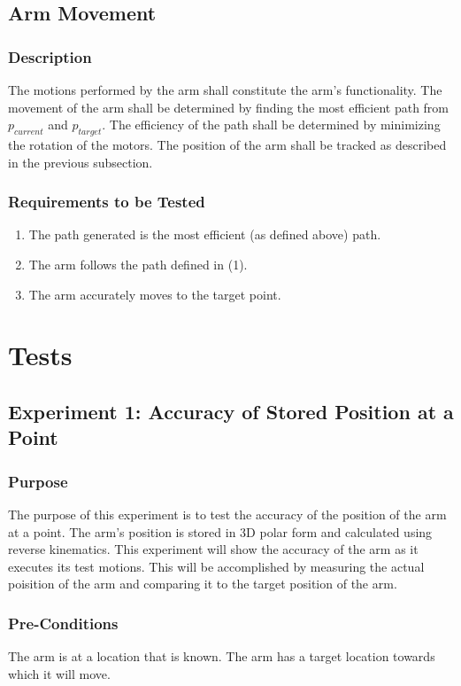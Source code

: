 \documentclass[letterpaper,10pt]{article}
\begin{document}
\subsection{Arm Movement}
\subsubsection{Description}
The motions performed by the arm shall constitute the arm's functionality. The
movement of the arm shall be determined by finding the most efficient path from
\(p_{current}\) and \(p_{target}\). The efficiency of the path shall be
determined by minimizing the rotation of the motors. The position of the arm
shall be tracked as described in the previous subsection.
\subsubsection{Requirements to be Tested}
\begin{enumerate}
\item{The path generated is the most efficient (as defined above) path.}
\item{The arm follows the path defined in (1).}
\item{The arm accurately moves to the target point.}
\end{enumerate}

\section{Tests}

\subsection{Experiment 1: Accuracy of Stored Position at a Point}
\subsubsection{Purpose}
The purpose of this experiment is to test the accuracy of the position of the
arm at a point. The arm's position is stored in 3D polar form and calculated
using reverse kinematics. This experiment will show the accuracy of the arm as
it executes its test motions. This will be accomplished by measuring the actual
poisition of the arm and comparing it to the target position of the arm.

\subsubsection{Pre-Conditions}
The arm is at a location that is known. The arm has a target location towards
which it will move.
\end{document}
